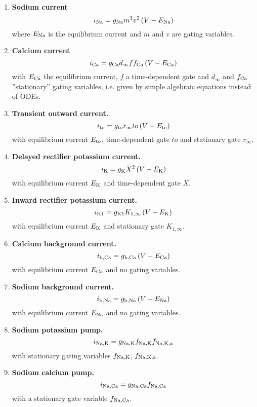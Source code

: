 \documentclass{scrartcl}
\begin{document}
\begin{enumerate}
\item {\bf Sodium current}
\begin{equation}
	i_{\rm Na} = g_{\rm Na} m^3 v^2 \left( V - E_{\rm Na} \right)
\end{equation}
where $E_{\rm Na}$ is the equilibrium current and $m$ and $v$ are gating variables.
\item {\bf Calcium current}
\begin{equation}
	i_{\rm Ca} = g_{\rm Ca} d_{\infty} f f_{\rm Ca} \left( V - E_{\rm Ca} \right)
\end{equation}
with $E_{\rm Ca}$ the equilibrium current, $f$ a time-dependent gate and  $d_{\infty}$ and $f_{\rm Ca}$ ''stationary'' gating variables, i.e. given by simple algebraic equations instead of ODEs.
\item {\bf Transient outward current.}
\begin{equation}
	i_{\rm to} = g_{\rm to} r_{\infty} to \left( V - E_{\rm to} \right)
\end{equation}
with equilibrium current $E_{\rm to}$, time-dependent gate $to$ and stationary gate $r_{\infty}$.
\item {\bf Delayed rectifier potassium current.}
\begin{equation}
	i_{\rm K} = g_{\rm K} X^2 \left( V - E_{\rm K} \right)
\end{equation}
with equilibrium current $E_{\rm K}$ and time-dependent gate $X$.
\item {\bf Inward rectifier potassium current.}
\begin{equation}
	i_{\rm K1} = g_{\rm K1} K_{1, \infty} \left( V - E_{\rm K} \right)
\end{equation}
with equilibrium current $E_{\rm K}$ and stationary gate $K_{1, \infty}$.
\item {\bf Calcium background current.}
\begin{equation}
	i_{\rm b, Ca} = g_{\rm b, Ca} \left( V - E_{\rm Ca} \right)
\end{equation}
with equilibrium current $E_{\rm Ca}$ and no gating variables.
\item {\bf Sodium background current.}
\begin{equation}
	i_{\rm b, Na} = g_{\rm b, Na} \left( V - E_{\rm Na} \right)
\end{equation}
with equilibrium current $E_{\rm Na}$ and no gating variables.
\item {\bf Sodium potassium pump.}
\begin{equation}
	i_{\rm Na, K} = g_{\rm Na, K} f_{\rm Na, K} f_{\rm Na, K, a}
\end{equation}
with stationary gating variables $f_{\rm Na, K}$, $f_{\rm Na, K, a}$.
\item {\bf Sodium calcium pump.}
\begin{equation}
	i_{\rm Na, Ca} = g_{\rm Na, Ca} f_{\rm Na, Ca}
\end{equation}
with a stationary gate variable $f_{\rm Na, Ca}$.
\end{enumerate}
%
%
\end{document}
